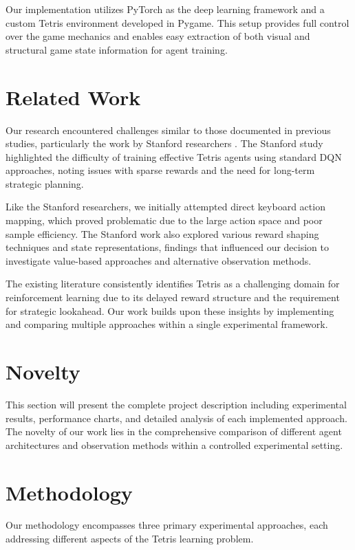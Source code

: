 \documentclass[conference]{IEEEtran}
\begin{document}
Our implementation utilizes PyTorch as the deep learning framework and a custom Tetris environment developed in Pygame. This setup provides full control over the game mechanics and enables easy extraction of both visual and structural game state information for agent training.

\section{Related Work}

Our research encountered challenges similar to those documented in previous studies, particularly the work by Stanford researchers \cite{stanford2016}. The Stanford study highlighted the difficulty of training effective Tetris agents using standard DQN approaches, noting issues with sparse rewards and the need for long-term strategic planning.

Like the Stanford researchers, we initially attempted direct keyboard action mapping, which proved problematic due to the large action space and poor sample efficiency. The Stanford work also explored various reward shaping techniques and state representations, findings that influenced our decision to investigate value-based approaches and alternative observation methods.

The existing literature consistently identifies Tetris as a challenging domain for reinforcement learning due to its delayed reward structure and the requirement for strategic lookahead. Our work builds upon these insights by implementing and comparing multiple approaches within a single experimental framework.

\section{Novelty}

This section will present the complete project description including experimental results, performance charts, and detailed analysis of each implemented approach. The novelty of our work lies in the comprehensive comparison of different agent architectures and observation methods within a controlled experimental setting.

\section{Methodology}

Our methodology encompasses three primary experimental approaches, each addressing different aspects of the Tetris learning problem.
\end{document}
